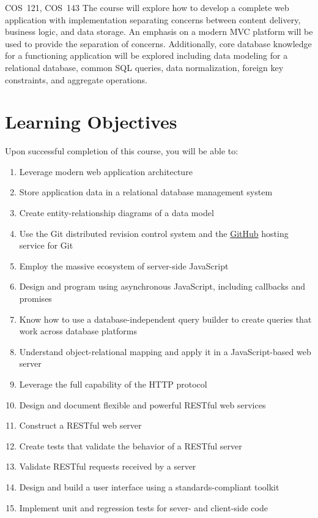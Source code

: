 \documentclass[11pt]{article}
\begin{document}




\tableofcontents

\begin{catalogentry}{COS~121, COS~143}
  The course will explore how to develop a complete web application
  with implementation separating concerns between
  content delivery, business logic, and data storage.
  An emphasis on a modern MVC platform will be used
  to provide the separation of concerns.
  Additionally, core database knowledge for a functioning application
  will be explored including data modeling for a relational database,
  common SQL queries, data normalization, foreign key
  constraints, and aggregate operations.
\end{catalogentry}

\section{Learning Objectives}

Upon successful completion of this course,
you will be able to:
\begin{enumerate}
\item Leverage modern web application architecture
\item Store application data in a relational database management system
\item Create entity-relationship diagrams of a data model
\item Use the Git distributed revision control system
  and the \href{https://github.com/}{GitHub} hosting service for Git
\item Employ the massive ecosystem of server-side JavaScript
\item Design and program using asynchronous JavaScript,
  including callbacks and promises
\item Know how to use a database-independent query builder
  to create queries that work across database platforms
\item Understand object-relational mapping
  and apply it in a JavaScript-based web server
\item Leverage the full capability of the HTTP protocol
\item Design and document flexible and powerful RESTful web services
\item Construct a RESTful web server
\item Create tests that validate the behavior of a RESTful server
\item Validate RESTful requests received by a server
\item Design and build a user interface using a standards-compliant toolkit 
\item Implement unit and regression tests for sever- and client-side code
\end{enumerate}
\end{document}
